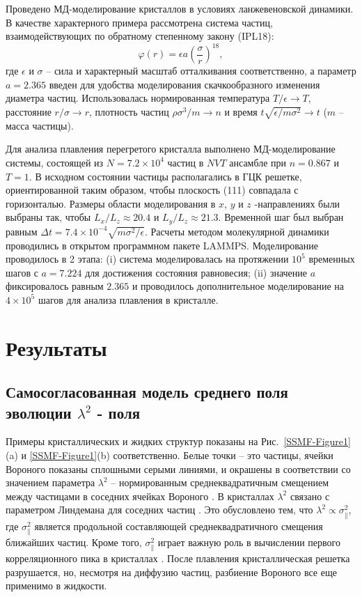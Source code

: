 Проведено МД-моделирование кристаллов в условиях ланжевеновской динамики.
В качестве характерного примера рассмотрена система частиц, взаимодействующих по обратному степенному закону (IPL18):
\begin{equation}
\label{SSMF-eq3}
\varphi(r) = \epsilon a \left(\frac{\sigma}{r}\right)^{18},
\end{equation}
где $\epsilon$ и $\sigma$ -- сила и характерный масштаб отталкивания соответственно,
а параметр $ a = 2.365 $ введен для удобства моделирования скачкообразного изменения диаметра частиц.
Использовалась нормированная температура $ T/ \epsilon \rightarrow T $, расстояние $ r/ \sigma \rightarrow r $, плотность частиц $\rho\sigma^3/m\rightarrow n$ и время $t\sqrt{\epsilon/m\sigma^2} \rightarrow t$ ($m$ -- масса частицы).

Для анализа плавления перегретого кристалла выполнено МД-моделирование системы, состоящей из $ N = 7.2 \times 10 ^ 4 $ частиц в $NVT$ ансамбле при $n=0.867$ и $T=1$.
В исходном состоянии частицы располагались в ГЦК решетке, ориентированной таким образом, чтобы плоскость (111) совпадала с горизонталью.
Размеры области моделирования в $ x $, $ y $ и $ z $ -направлениях были выбраны так, чтобы $ L_x / L_z \approx 20.4 $ и $ L_y / L_z \approx 21.3 $.
Временной шаг был выбран равным $ \Delta t = 7.4 \times 10 ^ {- 4} \sqrt {m \sigma ^ 2 / \epsilon} $. Расчеты методом молекулярной динамики проводились в открытом программном пакете LAMMPS.
Моделирование проводилось в 2 этапа: (i) система моделировалась на протяжении $ 10 ^ 5 $ временных шагов с $ a = 7.224 $ для достижения состояния равновесия; (ii) значение $a$ фиксировалось равным $ 2.365 $ и проводилось дополнительное моделирование на $ 4 \times 10 ^ 5 $ шагов для анализа плавления в кристалле.

\section{Результаты}
\subsection{Самосогласованная модель среднего поля эволюции $\lambda^2$ - поля}

Примеры кристаллических и жидких структур показаны на Рис.~\ref{SSMF-Figure1}(a) и \ref{SSMF-Figure1}(b) соответственно.
Белые точки -- это частицы, ячейки Вороного показаны сплошными серыми линиями, и окрашены в соответствии со значением параметра $\lambda^2$ -- нормированным среднеквадратичным смещением между частицами в соседних ячейках Вороного \cite{10.1021/acs.jpcc.7b09317}. %
В кристаллах $\lambda^2$ связано с параметром Линдемана для соседних частиц \cite{10.1016/0375-9601(85)90617-6}.
Это обусловлено тем, что $\lambda^2\propto \sigma_ \| ^ 2 $, где $ \sigma_ \| ^ 2 $ является продольной составляющей среднеквадратичного смещения ближайших частиц.
Кроме того, $ \sigma_ \| ^ 2 $ играет важную роль в вычислении первого корреляционного пика в кристаллах \cite{10.1063/1.4869863, 10.1063/1.4926945, 10.1088/0953-8984/28/23/235401, 10.1039/c7sm02429k, 10.1063/1.5116176}.
После плавления кристаллическая решетка разрушается, но, несмотря на диффузию частиц, разбиение Вороного все еще применимо в жидкости.


